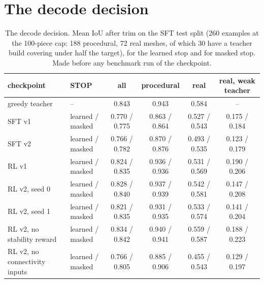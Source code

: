 \section{The decode decision}
\label{app:stop}
\begin{table}[h]
  \centering\small
  \caption{The decode decision. Mean IoU after trim on the SFT test split (260 examples at the 100-piece cap: 188
  procedural, 72 real meshes, of which 30 have a teacher build covering under half the target), for the learned stop
  and for masked stop. Made before any benchmark run of the checkpoint.}
  \label{tab:stop}
  \footnotesize
  \begin{tabular}{llcccc}
    \toprule
    checkpoint & STOP & all & procedural & real & real, weak teacher \\
    \midrule
    greedy teacher & -- & 0.843 & 0.943 & 0.584 & -- \\
    SFT v1 & learned / masked & 0.770 / 0.775 & 0.863 / 0.864 & 0.527 / 0.543 & 0.175 / 0.184 \\
    SFT v2 & learned / masked & 0.766 / 0.782 & 0.870 / 0.876 & 0.493 / 0.535 & 0.123 / 0.179 \\
    RL v1 & learned / masked & 0.824 / 0.835 & 0.936 / 0.936 & 0.531 / 0.569 & 0.190 / 0.206 \\
    RL v2, seed 0 & learned / masked & 0.828 / 0.840 & 0.937 / 0.939 & 0.542 / 0.581 & 0.147 / 0.208 \\
    RL v2, seed 1 & learned / masked & 0.821 / 0.835 & 0.931 / 0.935 & 0.533 / 0.574 & 0.141 / 0.204 \\
    RL v2, no stability reward & learned / masked & 0.834 / 0.842 & 0.940 / 0.941 & 0.559 / 0.587 & 0.188 / 0.223 \\
    RL v2, no connectivity inputs & learned / masked & 0.766 / 0.805 & 0.885 / 0.906 & 0.455 / 0.543 & 0.129 / 0.197 \\
    \bottomrule
  \end{tabular}
\end{table}

